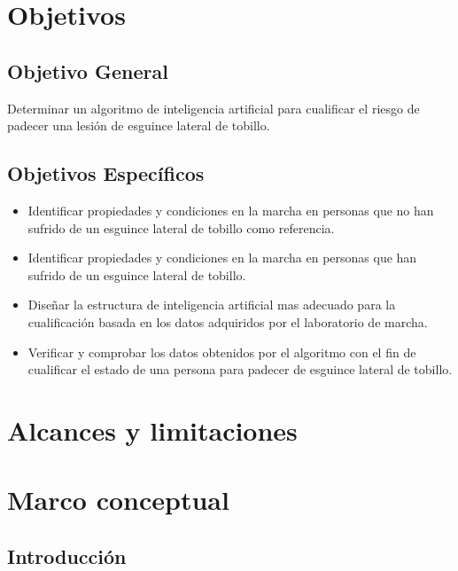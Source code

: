 \section{Objetivos}

\subsection{Objetivo General}

Determinar un algoritmo de inteligencia artificial para cualificar el riesgo de padecer una lesión de esguince lateral de tobillo.

\subsection{Objetivos Específicos}
\begin{itemize}
	\item Identificar propiedades y condiciones en la marcha en personas que no han sufrido de un esguince lateral de tobillo como referencia.
	\item Identificar propiedades y condiciones en la marcha en personas que han sufrido de un esguince lateral de tobillo.
	\item Diseñar la estructura de inteligencia artificial mas adecuado para la cualificación basada en los datos adquiridos por el laboratorio de marcha.
	\item Verificar y comprobar los datos obtenidos por el algoritmo con el fin de cualificar el estado de una persona para padecer de esguince lateral de tobillo. 
\end{itemize}


\section{Alcances y limitaciones}


\section{Marco conceptual}


\subsection{Introducción}


